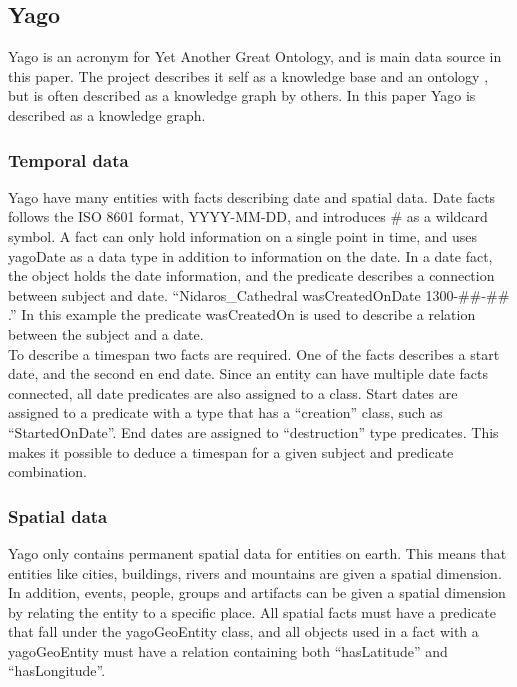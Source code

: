 \subsection{Yago}
Yago is an acronym for Yet Another Great Ontology, and is main data source in this paper. The project describes it self as a knowledge base\cite{yago} and an ontology \cite{mahdisoltani:hal-01699874}, but is often described as a knowledge graph by others. In this paper Yago is described as a knowledge graph.\\

\subsubsection{Temporal data}
Yago have many entities with facts describing date and spatial data.\cite{yago} Date facts follows the ISO 8601 format, YYYY-MM-DD, and introduces \# as a wildcard symbol. A fact can only hold information on a single point in time, and uses yagoDate as a data type in addition to information on the date.\cite{yago} In a date fact, the object holds the date information, and the predicate describes a connection between subject and date. ``Nidaros\_Cathedral wasCreatedOnDate 1300-\#\#-\#\# .'' In this example the predicate wasCreatedOn is used to describe a relation between the subject and a date.\\

To describe a timespan two facts are required. One of the facts describes a start date, and the second en end date. Since an entity can have multiple date facts connected, all date predicates are also assigned to a class. Start dates are assigned to a predicate with a type that has a ``creation'' class, such as ``StartedOnDate''. End dates are assigned to ``destruction'' type predicates. This makes it possible to deduce a timespan for a given subject and predicate combination.\cite{yago}\\

\subsubsection{Spatial data}
Yago only contains permanent spatial data for entities on earth. This means that entities like cities, buildings, rivers and mountains are given a spatial dimension. In addition, events, people, groups and artifacts can be given a spatial dimension by relating the entity to a specific place. All spatial facts must have a predicate that fall under the yagoGeoEntity class, and all objects used in a fact with a yagoGeoEntity must have a relation containing both ``hasLatitude'' and ``hasLongitude''.


